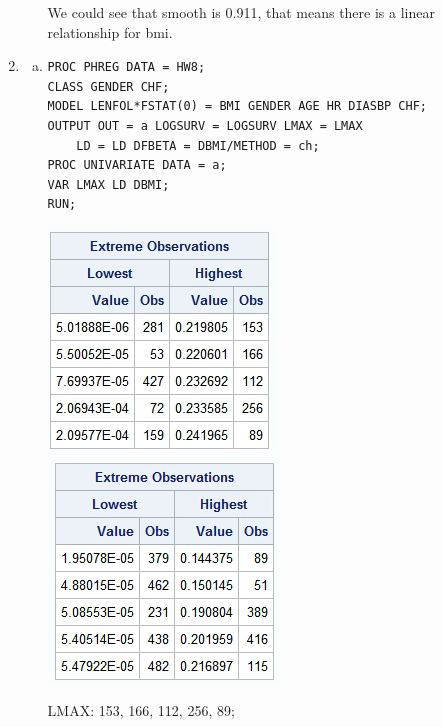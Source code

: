 \documentclass{elegantbook}
\begin{document}
\begin{solution}
\begin{enumerate}
\begin{enumerate}[(a)]
\begin{center}
            \end{center}
            We could see that smooth is 0.911, that means there is a linear relationship for bmi. 
        \end{enumerate}
        \item \begin{enumerate}[(a)]
            \item \begin{verbatim}
PROC PHREG DATA = HW8; 
CLASS GENDER CHF; 
MODEL LENFOL*FSTAT(0) = BMI GENDER AGE HR DIASBP CHF; 
OUTPUT OUT = a LOGSURV = LOGSURV LMAX = LMAX 
    LD = LD DFBETA = DBMI/METHOD = ch;
PROC UNIVARIATE DATA = a; 
VAR LMAX LD DBMI; 
RUN; 
            \end{verbatim}
            \begin{center}
                \includegraphics[width=.3\textwidth]{q2a1.png}
                \includegraphics[width=.305\textwidth]{q2a2.png}
            \end{center}
            LMAX: 153, 166, 112, 256, 89; 


\end{enumerate}
\end{enumerate}
\end{solution}
\end{document}

